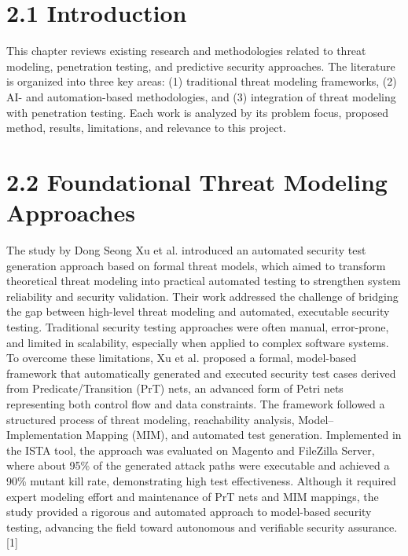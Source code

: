 \documentclass[12pt,a4paper]{report}
\begin{document}
\section{2.1 Introduction}

This chapter reviews existing research and methodologies related to threat modeling, penetration testing, and predictive security approaches. The literature is organized into three key areas: (1) traditional threat modeling frameworks, (2) AI- and automation-based methodologies, and (3) integration of threat modeling with penetration testing. Each work is analyzed by its problem focus, proposed method, results, limitations, and relevance to this project.

\section{2.2 Foundational Threat Modeling Approaches}

The study by Dong Seong Xu et al. introduced an automated security test generation approach based on formal threat models, which aimed to transform theoretical threat modeling into practical automated testing to strengthen system reliability and security validation. Their work addressed the challenge of bridging the gap between high-level threat modeling and automated, executable security testing. Traditional security testing approaches were often manual, error-prone, and limited in scalability, especially when applied to complex software systems. To overcome these limitations, Xu et al. proposed a formal, model-based framework that automatically generated and executed security test cases derived from Predicate/Transition (PrT) nets, an advanced form of Petri nets representing both control flow and data constraints. The framework followed a structured process of threat modeling, reachability analysis, Model–Implementation Mapping (MIM), and automated test generation. Implemented in the ISTA tool, the approach was evaluated on Magento and FileZilla Server, where about 95\% of the generated attack paths were executable and achieved a 90\% mutant kill rate, demonstrating high test effectiveness. Although it required expert modeling effort and maintenance of PrT nets and MIM mappings, the study provided a rigorous and automated approach to model-based security testing, advancing the field toward autonomous and verifiable security assurance. [1]
\end{document}
